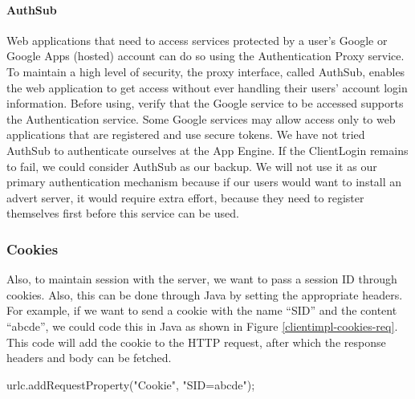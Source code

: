 
\paragraph{AuthSub}
Web applications that need to access services protected by a user's Google or
Google Apps (hosted) account can do so using the Authentication Proxy service. To
maintain a high level of security, the proxy interface, called AuthSub, enables
the web application to get access without ever handling their users' account
login information. Before using, verify that the Google service to be accessed
supports the Authentication service. Some Google services may allow access only
to web applications that are registered and use secure tokens. We have not tried
AuthSub to authenticate ourselves at the App Engine. If the ClientLogin remains
to fail, we could consider AuthSub as our backup. We will not use it as our
primary authentication mechanism because if our users would want to install an
advert server, it would require extra effort, because they need to register
themselves first before this service can be used.

\subsubsection{Cookies}
Also, to maintain session with the server, we want to pass a session ID through
cookies. Also, this can be done through Java by setting the appropriate headers.
For example, if we want to send a cookie with the name ``SID'' and the content
``abcde'', we could code this in Java as shown in Figure
\ref{clientimpl-cookies-req}. This code will add the cookie to the HTTP request,
after which the response headers and body can be fetched.

\begin{figure*}[ht] %
\begin{center}
\begin{code}
urlc.addRequestProperty("Cookie", "SID=abcde");
\end{code}
\caption{Sending cookies in Java.\label{clientimpl-cookies-req}}
\end{center}
\end{figure*}

